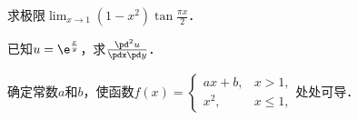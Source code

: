 \documentclass[plain,noanswer,medmath]{../../template/jnuexam}
\begin{document}




























\begin{problem}
求极限$\lim_{x \to 1} (1 - x^2)\tan \frac{\pi x}{2}$．
\end{problem}


\begin{problem}
已知$u = \e^{\frac{x}{y}}$，求$\frac{\pd^2 u}{\pdx\pd y}$．
\end{problem}







\begin{problem}
确定常数$a$和$b$，使函数$f(x) = \begin{cases}
  ax + b, & x > 1, \\
     x^2, & x \le 1,
\end{cases}$处处可导．
\end{problem}



%



%



%


\end{document}
